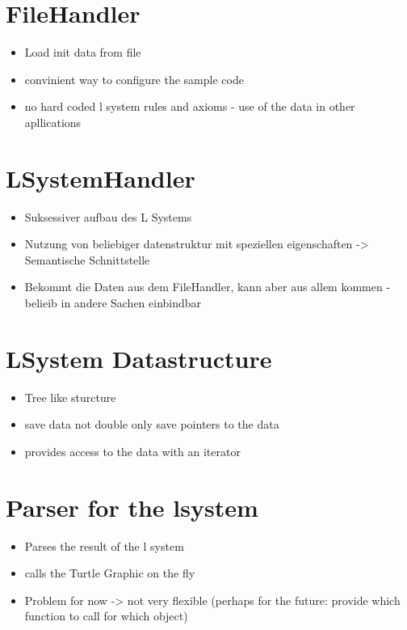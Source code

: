 \documentclass[english]{cpp-hmwk}
\begin{document}
\section{FileHandler}

\begin{itemize}
	\item Load init data from file
	\item convinient way to configure the sample code
	\item no hard coded l system rules and axioms - use of the data in other apllications
\end{itemize}

\section{LSystemHandler}

\begin{itemize}
	\item Suksessiver aufbau des L Systems
	\item Nutzung von beliebiger datenstruktur mit speziellen eigenschaften -> Semantische Schnittstelle
	\item Bekommt die Daten aus dem FileHandler, kann aber aus allem kommen - belieib in andere Sachen einbindbar
\end{itemize}

\section{LSystem Datastructure}

\begin{itemize}
	\item Tree like sturcture
	\item save data not double only save pointers to the data
	\item provides access to the data with an iterator
\end{itemize}

\section{Parser for the lsystem}
\begin{itemize}
	\item Parses the result of the l system
	\item calls the Turtle Graphic on the fly
	
	\item Problem for now -> not very flexible (perhaps for the future: provide which function to call for which object)
\end{itemize}
\end{document}
